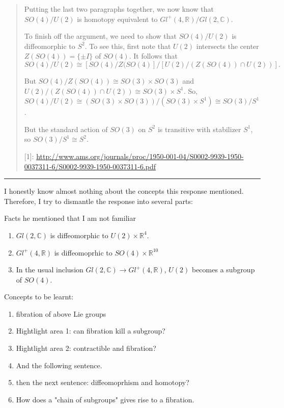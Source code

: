 \documentclass{article}
\numberwithin{equation}{subsection} %
\theoremstyle{definition}
\begin{document}
\begin{quote}
        Putting the last two paragraphs together, we now know that $SO(4)/U(2)$
        is homotopy equivalent to $Gl^+(4,\mathbb{R})/Gl(2,\mathbb{C})$.  

        To finish off the argument, we need to show that $SO(4)/U(2)$ is
        diffeomorphic to $S^2$.  To see this, first note that $U(2)$ intersects
        the center $Z(SO(4)) = \{\pm I\}$ of $SO(4)$.  It follows that
        $$SO(4)/U(2) \cong [SO(4)/Z(SO(4)]/[U(2)/(Z(SO(4))\cap U(2))].$$

        But $SO(4)/Z(SO(4))\cong SO(3)\times SO(3)$ and $U(2)/(Z(SO(4))\cap
        U(2)) \cong SO(3)\times S^1$.  So, $SO(4)/U(2)\cong (SO(3)\times
        SO(3))/(SO(3)\times S^1)\cong SO(3)/S^1$.

        But the standard action of $SO(3)$ on $S^2$ is transitive with
        stabilizer $S^1$, so $SO(3)/S^1 \cong S^2$.  

        [1]:
        \url{http://www.ams.org/journals/proc/1950-001-04/S0002-9939-1950-0037311-6/S0002-9939-1950-0037311-6.pdf}
    \end{quote}
    \begin{center}\noindent\rule{8cm}{0.4pt}\end{center}

    I honestly know almost nothing about the concepts this response mentioned.
    Therefore, I try to dismantle the response into several parts:

    Facts he mentioned that I am not familiar
    \begin{enumerate}
        \item $Gl(2,\mathbb{C})$ is diffeomorphic to $U(2)\times\mathbb{R}^4$.
        \item $Gl^+(4,\mathbb{R})$ is diffeomoprhic to $SO(4)\times
            \mathbb{R}^10$
        \item In the usual inclusion $Gl(2,\mathbb{C})\rightarrow
            Gl^+(4,\mathbb{R})$, $U(2)$ becomes a subgroup of $SO(4)$.
    \end{enumerate}
    Concepts to be learnt:
    \begin{enumerate}
        \item fibration of above Lie groups
        \item Hightlight area 1: can fibration kill a subgroup?
        \item Hightlight area 2: contractible and fibration?
        \item And the following sentence.
        \item then the next sentence: diffeomoprhism and homotopy?
        \item How does a "chain of subgroups" gives rise to a fibration.
    \end{enumerate}
\end{document}
